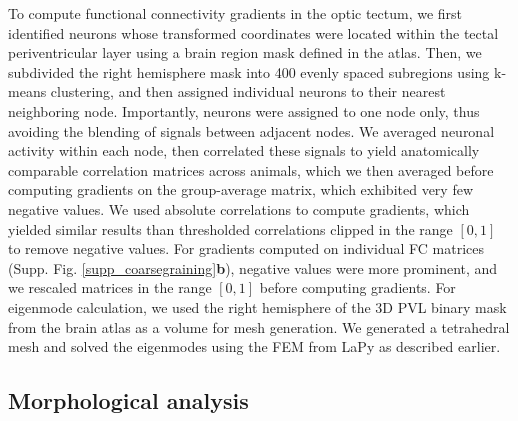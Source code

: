 \documentclass{article}
\begin{document}
To compute functional connectivity gradients in the optic tectum, we first identified neurons whose transformed coordinates were located within the tectal periventricular layer using a brain region mask defined in the atlas. Then, we subdivided the right hemisphere mask into 400 evenly spaced subregions using k-means clustering, and then assigned individual neurons to their nearest neighboring node. Importantly, neurons were assigned to one node only, thus avoiding the blending of signals between adjacent nodes. We averaged neuronal activity within each node, then correlated these signals to yield anatomically comparable correlation matrices across animals, which we then averaged before computing gradients on the group-average matrix, which exhibited very few negative values. We used absolute correlations to compute gradients, which yielded similar results than thresholded correlations clipped in the range $[0, 1]$ to remove negative values. For gradients computed on individual FC matrices (Supp. Fig. \ref{supp_coarsegraining}\textbf{b}), negative values were more prominent, and we rescaled matrices in the range $[0, 1]$ before computing gradients. For eigenmode calculation, we used the right hemisphere of the 3D PVL binary mask from the brain atlas as a volume for mesh generation. We generated a tetrahedral mesh and solved the eigenmodes using the FEM from LaPy as described earlier.

\subsection*{Morphological analysis}
\end{document}
